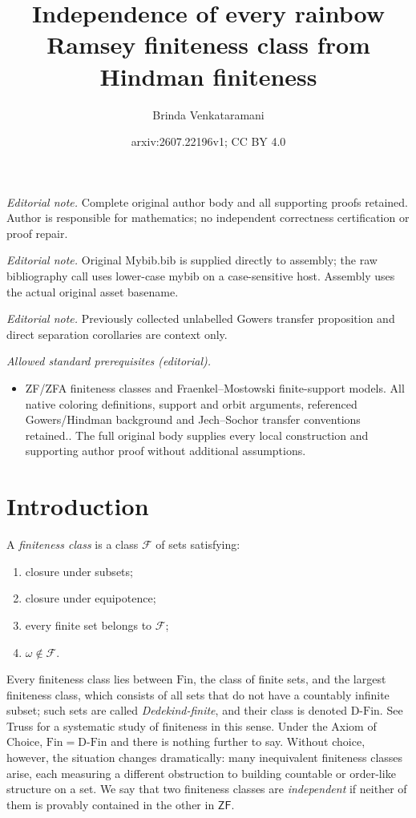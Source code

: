 \documentclass[10pt,a4paper]{amsart}
\title{Independence of every rainbow Ramsey finiteness class from Hindman finiteness}
\author{Brinda Venkataramani}
\date{arxiv:2607.22196v1; CC BY 4.0}
\theoremstyle{definition}
\newcommand{\ZF}{\mathsf{ZF}}
\newcommand{\Fin}{\mathrm{Fin}}
\newcommand{\DFin}{\mathrm{D\text{-}Fin}}
\begin{document}
\maketitle
\noindent\textit{Editorial note.} Complete original author body and all supporting proofs retained. Author is responsible for mathematics; no independent correctness certification or proof repair.\par\medskip
\noindent\textit{Editorial note.} Original Mybib.bib is supplied directly to assembly; the raw bibliography call uses lower-case mybib on a case-sensitive host. Assembly uses the actual original asset basename.\par\medskip
\noindent\textit{Editorial note.} Previously collected unlabelled Gowers transfer proposition and direct separation corollaries are context only.\par\medskip
\noindent\textit{Allowed standard prerequisites (editorial).}\begin{itemize}
\item ZF/ZFA finiteness classes and Fraenkel--Mostowski finite-support models. All native coloring definitions, support and orbit arguments, referenced Gowers/Hindman background and Jech--Sochor transfer conventions retained.. The full original body supplies every local construction and supporting author proof without additional assumptions.
\end{itemize}\medskip
\section{Introduction}

A \emph{finiteness class} is a class \(\mathcal F\) of sets satisfying:
\begin{enumerate}[label=(\roman*)]
    \item closure under subsets;
    \item closure under equipotence;
    \item every finite set belongs to \(\mathcal F\);
    \item \(\omega\notin \mathcal F\).
\end{enumerate}
Every finiteness class lies between \(\Fin\), the class of finite sets, and the largest finiteness class, which consists of all sets that do not have a countably infinite subset; such sets are called \emph{Dedekind-finite}, and their class is denoted \(\DFin\).  See Truss \cite{TrussFiniteness} for a systematic study of finiteness in this sense.  Under the Axiom of Choice, \(\Fin=\DFin\) and there is nothing further to say.  Without choice, however, the situation changes dramatically: many inequivalent finiteness classes arise, each measuring a different obstruction to building countable or order-like structure on a set.  We say that two finiteness classes are \emph{independent} if neither of them is provably contained in the other in \(\ZF\).
\end{document}

